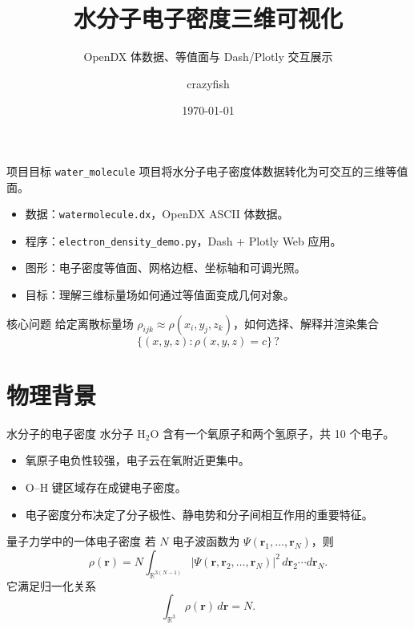\documentclass[aspectratio=169,11pt]{ctexbeamer}
\title{水分子电子密度三维可视化}
\subtitle{OpenDX 体数据、等值面与 Dash/Plotly 交互展示}
\author{crazyfish}
\date{\today}
\begin{document}
\begin{frame}
  \titlepage
\end{frame}

\begin{frame}{项目目标}
  \texttt{water\_molecule} 项目将水分子电子密度体数据转化为可交互的三维等值面。

  \begin{itemize}
    \item 数据：\texttt{watermolecule.dx}，OpenDX ASCII 体数据。
    \item 程序：\texttt{electron\_density\_demo.py}，Dash + Plotly Web 应用。
    \item 图形：电子密度等值面、网格边框、坐标轴和可调光照。
    \item 目标：理解三维标量场如何通过等值面变成几何对象。
  \end{itemize}

  \begin{block}{核心问题}
    给定离散标量场 $\rho_{ijk}\approx \rho(x_i,y_j,z_k)$，如何选择、解释并渲染集合
    \[
      \{(x,y,z): \rho(x,y,z)=c\}\, ?
    \]
  \end{block}
\end{frame}

\section{物理背景}

\begin{frame}{水分子的电子密度}
  水分子 H$_2$O 含有一个氧原子和两个氢原子，共 10 个电子。

  \begin{itemize}
    \item 氧原子电负性较强，电子云在氧附近更集中。
    \item O--H 键区域存在成键电子密度。
    \item 电子密度分布决定了分子极性、静电势和分子间相互作用的重要特征。
  \end{itemize}

  \begin{block}{量子力学中的一体电子密度}
    若 $N$ 电子波函数为 $\Psi(\mathbf r_1,\ldots,\mathbf r_N)$，则
    \[
      \rho(\mathbf r)
      =
      N\int_{\mathbb R^{3(N-1)}}
      |\Psi(\mathbf r,\mathbf r_2,\ldots,\mathbf r_N)|^2
      \,d\mathbf r_2\cdots d\mathbf r_N .
    \]
    它满足归一化关系
    \[
      \int_{\mathbb R^3}\rho(\mathbf r)\,d\mathbf r = N .
    \]
  \end{block}
\end{frame}
\end{document}

